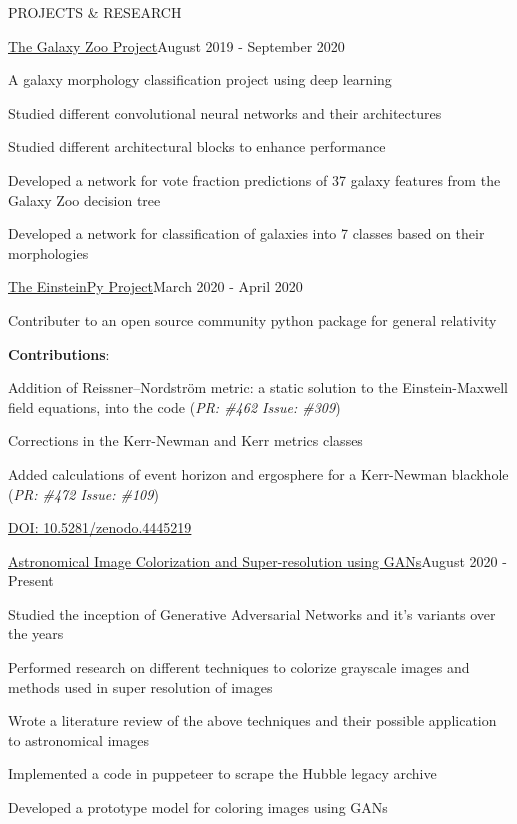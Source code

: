 \documentclass{resume} %
\begin{document}
\begin{rSection}{PROJECTS \& RESEARCH}

\begin{rSubsection}{\href{https://github.com/obi-wan-shinobi/Galaxy_Zoo}{The Galaxy Zoo Project}}{August 2019 - September 2020}{}{}
\item A galaxy morphology classification project using deep learning
\item Studied different convolutional neural networks and their architectures
\item Studied different architectural blocks to enhance performance
\item Developed a network for vote fraction predictions of 37 galaxy features from the Galaxy Zoo decision tree
\item Developed a network for classification of galaxies into 7 classes based on their morphologies
\end{rSubsection}

\begin{rSubsection}{\href{https://github.com/obi-wan-shinobi/einsteinpy}{The EinsteinPy Project}}{March 2020 - April 2020}{}{}
\item Contributer to an open source community python package for general relativity
\item \textbf{Contributions}:
\item Addition of  Reissner–Nordström metric: a static solution to the Einstein-Maxwell field equations, into the code (\textit{PR: \#462 Issue: \#309})
\item Corrections in the Kerr-Newman and Kerr metrics classes
\item Added calculations of event horizon and ergosphere for a Kerr-Newman blackhole (\textit{PR: \#472 Issue: \#109})
\item \href{https://doi.org/10.5281/zenodo.4445219
}{DOI: 10.5281/zenodo.4445219}
\end{rSubsection}

\begin{rSubsection}{\href{https://github.com/users/obi-wan-shinobi/projects/1}{Astronomical Image Colorization and Super-resolution using GANs}}{August 2020 - Present}{}{}
\item Studied the inception of Generative Adversarial Networks and it's variants over the years
\item Performed research on different techniques to colorize grayscale images and methods used in super resolution of images
\item Wrote a literature review of the above techniques and their possible application to astronomical images
\item Implemented a code in puppeteer to scrape the Hubble legacy archive
\item Developed a prototype model for coloring images using GANs
\end{rSubsection}


\end{rSection}
\end{document}
